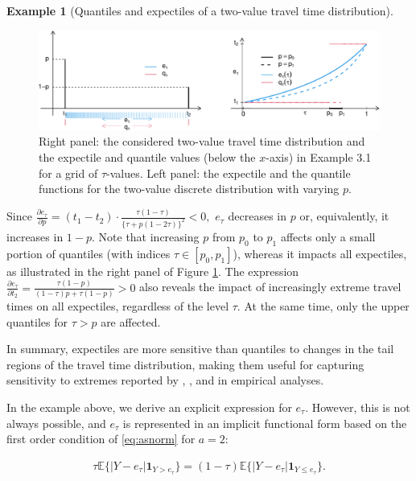 \documentclass[preprint, 3p, authoryear]{elsarticle} %
\theoremstyle{definition}
\theoremstyle{definition}
\newtheorem{example}{Example}[section]
\theoremstyle{definition}
\theoremstyle{definition}
\theoremstyle{remark}
\begin{document}
\begin{example}[Quantiles and expectiles of a two-value travel time distribution]
\begin{figure}
\includegraphics[width=1\linewidth]{traffic-expectiles_files/figure-latex/figex1-1} \caption{Right panel: the considered two-value travel time distribution and the expectile and quantile values (below the $x$-axis) in Example 3.1 for a grid of $\tau$-values. Left panel: the expectile and the quantile functions for the two-value discrete distribution with varying $p$. }\label{fig:figex1}
\end{figure}

Since \(\frac{\partial e_\tau}{\partial p} =(t_1-t_2)\cdot \frac{ \tau (1-\tau)} {\{\tau+p (1-2\tau )\}^2} <0,\) \(e_\tau\) decreases in \(p\) or, equivalently, it increases in \(1-p\). Note that increasing \(p\) from \(p_0\) to \(p_1\) affects only a small portion of quantiles (with indices \(\tau\in[p_0,p_1]\)), whereas it impacts all expectiles, as illustrated in the right panel of Figure \ref{fig:figex1}. The expression \(\frac{\partial e_\tau}{\partial t_2} =\frac{\tau (1-p)}{(1-\tau)p + \tau(1-p)} >0\) also reveals the impact of increasingly extreme travel times on all expectiles, regardless of the level \(\tau\). At the same time, only the upper quantiles for \(\tau>p\) are affected.

In summary, expectiles are more sensitive than quantiles to changes in the tail regions of the travel time distribution, making them useful for capturing sensitivity to extremes reported by \citet{enide2006}, \citet{vanlint_etal08}, and \citet{sikka_hanley13} in empirical analyses.
\end{example}

In the example above, we derive an explicit expression for \(e_\tau\). However, this is not always possible, and \(e_\tau\) is represented in an implicit functional form based on the first order condition of \eqref{eq:asnorm} for \(a=2\):

\begin{align}
\tau\mathbb E\{|Y-e_\tau|\mathbf 1_{Y>e_\tau}\} = (1-\tau)\mathbb E\{|Y-e_\tau|\mathbf 1_{Y\leq e_\tau}\}.\label{eq:etau}
\end{align}
\end{document}

